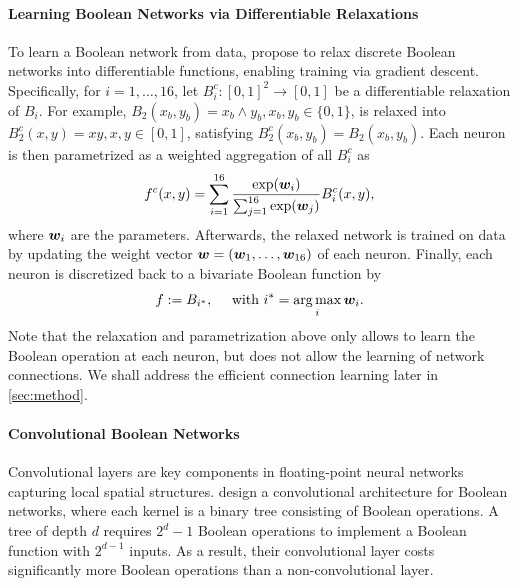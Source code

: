 \paragraph{Learning Boolean Networks via Differentiable Relaxations} To learn a Boolean network from data, \citet{petersen2022deep} propose to 
relax  discrete Boolean networks into differentiable functions, enabling training via gradient descent.
Specifically, for $i=1,\ldots, 16$, let $B_i^c:[0,1]^2\rightarrow [0,1]$ be a differentiable relaxation of $B_i$. 
For example, $B_2(x_b,y_b) = x_b\wedge y_b, x_b,y_b\in \{0,1\}$, is relaxed into $B_2^c(x,y) = xy, x,y\in [0,1]$, satisfying $B_2^c(x_b, y_b) = B_2(x_b, y_b)$.
Each neuron is then parametrized as a weighted aggregation of all $B_i^c$ as 
\begin{equation} \label{eq:relaxation}
    f^c(x,y) = \sum_{i=1}^{16} \frac{\exp({\bm{w}}_i)}{\sum_{j=1}^{16} \exp({\bm{w}}_j)} B_i^c(x,y),
\end{equation}
where ${\bm{w}}_i$ are the parameters.
Afterwards, the relaxed network is trained on data by updating the weight vector ${\bm{w}} = ({\bm{w}}_1,\ldots,{\bm{w}}_{16})$ of each neuron. 
Finally, each neuron is discretized back to a bivariate Boolean function by 
\begin{equation} \label{eq:discretization}
    f := B_{i^*},  \quad \text{ with } i^* = \operatorname*{arg\,max}_{i} {\bm{w}}_i.
\end{equation}
Note that the relaxation and parametrization above only allows 
to learn the Boolean operation at each neuron, but does not allow the learning of network connections. 
We shall address the efficient connection learning  later in \cref{sec:method}.

\paragraph{Convolutional Boolean Networks} 
Convolutional layers are key components in floating-point neural networks 
capturing local spatial structures. 
\citet{petersen2024convolutional} design a convolutional architecture for Boolean networks,  where each kernel is a binary tree consisting of Boolean operations. 
A tree of depth $d$ requires $2^d-1$ Boolean operations to 
implement a Boolean function with $2^{d-1}$ inputs. As a result, their convolutional layer 
costs significantly more Boolean operations than a non-convolutional layer. 


